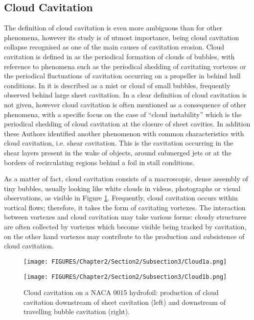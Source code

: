 \subsection{Cloud Cavitation}

The definition of cloud cavitation is even more ambiguous than for other phenomena, however its study is of utmost importance, being cloud cavitation collapse recognised as one of the main causes of cavitation erosion. 
Cloud cavitation is defined in \cite{brennen2014cavitation} as the periodical formation of clouds of bubbles, with reference to phenomena such as the periodical shedding of cavitating vortexes or the periodical fluctuations of cavitation occurring on a propeller in behind hull conditions. In \cite{carlton2018marine} it is described as a mist or cloud of small bubbles, frequently observed behind large sheet cavitation. In \cite{franc2006fundamentals} a clear definition of cloud cavitation is not given, however cloud cavitation is often mentioned as a consequence of other phenomena, with a specific focus on the case of “cloud instability” which is the periodical shedding of cloud cavitation at the closure of sheet cavities. In addition these Authors identified another phenomenon with common characteristics with cloud cavitation, i.e. shear cavitation. This is the cavitation occurring in the shear layers present in the wake of objects, around submerged jets or at the borders of recirculating regions behind a foil in stall conditions. 

As a matter of fact, cloud cavitation consists of a macroscopic, dense assembly of tiny bubbles, usually looking like white clouds in videos, photographs or visual observations, as visible in Figure \ref{fig:Cloud1}. Frequently, cloud cavitation occurs within vortical flows; therefore, it takes the form of cavitating vortexes. The interaction between vortexes and cloud cavitation may take various forms: cloudy structures are often collected by vortexes which become visible being tracked by cavitation, on the other hand vortexes may contribute to the production and subsistence of cloud cavitation.

\begin{figure}[h!]
    \centering
    \begin{minipage}{0.45\textwidth}
        \centering
        \texttt{[image: FIGURES/Chapter2/Section2/Subsection3/Cloud1a.png]} 
    \end{minipage}
    \hfill
    \begin{minipage}{0.45\textwidth}
        \centering
        \texttt{[image: FIGURES/Chapter2/Section2/Subsection3/Cloud1b.png]} 
    \end{minipage}
    \caption{Cloud cavitation on a NACA 0015 hydrofoil: production of cloud cavitation downstream of sheet cavitation (left) and downstream of travelling bubble cavitation (right).}
    \label{fig:Cloud1}
\end{figure}


